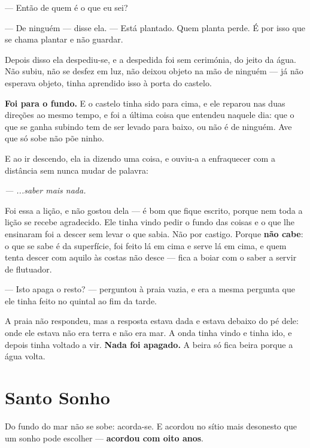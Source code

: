 \documentclass[livro.tex]{subfiles}
\begin{document}
\medskip
\noindent --- Então de quem é o que eu sei?

--- De ninguém --- disse ela. --- Está plantado. Quem planta perde. É por isso
que se chama plantar e não guardar.

\medskip
\noindent Depois disso ela despediu-se, e a despedida foi sem cerimónia, do
jeito da água. Não subiu, não se desfez em luz, não deixou objeto na mão de
ninguém --- \Ben já não esperava objeto, tinha aprendido isso à porta do
castelo.

\medskip
\noindent \textbf{Foi para o fundo.} E o castelo tinha sido para cima, e ele
reparou nas duas direções ao mesmo tempo, e foi a última coisa que entendeu
naquele dia: que o que se ganha subindo tem de ser levado para baixo, ou não é
de ninguém. Ave que só sobe não põe ninho.

\medskip
\noindent E ao ir descendo, ela ia dizendo uma coisa, e \Ben ouviu-a a
enfraquecer com a distância sem nunca mudar de palavra:

\begin{center}
\emph{--- ...saber mais nada.}
\end{center}

\medskip
\noindent Foi essa a lição, e \Ben não gostou dela --- é bom que fique
escrito, porque nem toda a lição se recebe agradecido. Ele tinha vindo pedir o
fundo das coisas e o que lhe ensinaram foi a descer sem levar o que sabia. Não
por castigo. Porque \textbf{não cabe}: o que se sabe é da superfície, foi feito
lá em cima e serve lá em cima, e quem tenta descer com aquilo às costas não
desce --- fica a boiar com o saber a servir de flutuador.

\medskip
\noindent --- Isto apaga o resto? --- perguntou \Ben à praia vazia, e era a
mesma pergunta que ele tinha feito no quintal ao fim da tarde.

\medskip
\noindent A praia não respondeu, mas a resposta estava dada e estava debaixo do
pé dele: onde ele estava não era terra e não era mar. A onda tinha vindo e
tinha ido, e depois tinha voltado a vir. \textbf{Nada foi apagado.} A beira só
fica beira porque a água volta.

\chapter{Santo Sonho}

Do fundo do mar não se sobe: acorda-se. E \Ben acordou no sítio mais
desonesto que um sonho pode escolher --- \textbf{acordou com oito anos}.
\end{document}
